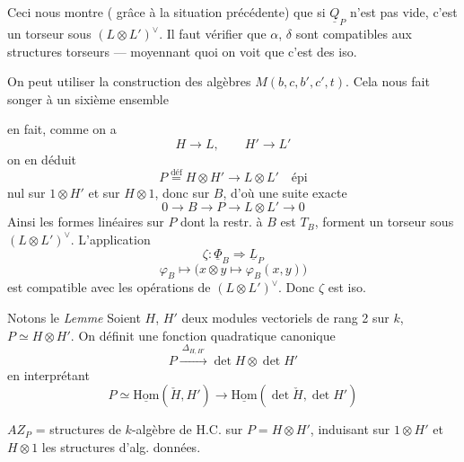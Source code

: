 \documentclass[11pt,a4paper]{article}
\begin{document}
Ceci nous montre ( grâce à  la situation précédente) que si $\underline{Q}_P$ n'est pas vide, c'est un torseur sous  $(L\otimes L')^{\vee}$. Il faut vérifier que $\alpha$, $\delta$ sont compatibles aux structures torseurs --- moyennant quoi on voit que c'est des iso.

On peut utiliser la construction des algèbres $M(b,c,b',c',t)$. Cela nous fait songer à un sixième ensemble

en fait, comme on a
\[ H\to L , \qquad H'\to L' \]
on en déduit
\[ P \overset{\text{déf}}{=} H\otimes H' \longrightarrow L\otimes L' \quad \text{épi} \]
nul sur $1\otimes H'$ et sur $H\otimes 1$, donc sur $B$, d'où une suite exacte
\[ 0 \to B \to P \to L\otimes L' \to 0 \]
 Ainsi les formes linéaires  sur $P$ dont la restr. à $B$ est $T_B$, forment  un torseur sous $(L\otimes L')^{\vee}$. L'application
\[ \zeta : \underline{\Phi}_B \Longrightarrow \underline{L}_P \]
\[ \varphi_B \longmapsto \bigl( x\otimes y \mapsto \varphi_B(x,y) \bigr) \]
est compatible avec les opérations de $(L\otimes L')^{\vee}$. Donc $\zeta$ est iso.

Notons le \emph{Lemme} Soient $H$, $H'$ deux modules vectoriels de rang 2 sur $k$, $P\simeq H\otimes H'$. On définit une fonction quadratique canonique
\[ P \xrightarrow{\ \Delta_{H,H'}\ } \det H \otimes \det H' \]
en interprétant
\[ P \simeq \underline{\mathrm{Hom}}(\check{H},H') \to \underline{\mathrm{Hom}}(\det\check{H},\det H') \]

$AZ_P$ = structures de $k$-algèbre de H.C. sur $P=H\otimes H'$, induisant sur $1\otimes H'$ et $H\otimes1$ les structures d'alg. données.

\end{document}
